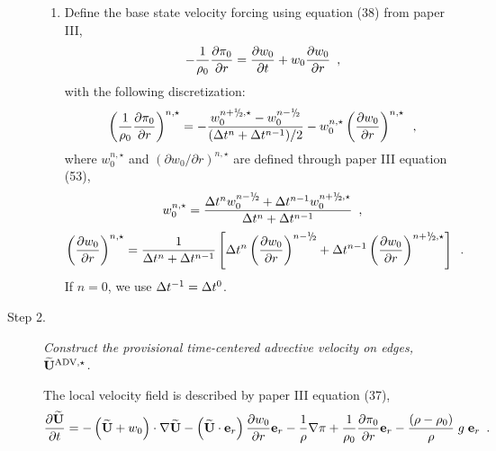 \begin{description}
\begin{enumerate}
\item Define the base state velocity forcing using equation (38) from paper III,
\begin{equation}
-\frac{1}{\rho_0} \frac{\partial \pi_0}{\partial r} 
= \frac{\partial w_0}{\partial t} + w_0 \frac{\partial w_0}{\partial r} 
\enskip, \label{eq:pizero}
\end{equation}
with the following discretization:
\begin{equation}
\left ( \frac{1}{\rho_0} \frac{\partial \pi_0}{\partial r} \right )^{n,\star} = 
-\frac{w_0^{\nph,\star} - w_0^\nmh}{(\dt^n+\dt^{n-1})/2} 
- w_0^{n,\star} \left(\frac{\partial w_0}{\partial r}\right)^{n,\star} \enskip ,
\end{equation} 
where $w_0^{n,\star}$ and $(\partial w_0 / \partial r)^{n,\star}$ are defined through 
paper III equation (53),
\begin{equation}
w_0^{n,\star} = \frac{\dt^{n} w_0^{\nmh} + \dt^{n-1} w_0^{\nph,\star}}{\dt^n+\dt^{n-1}} 
\enskip,
\end{equation}
\begin{equation}
\left(\frac{\partial w_0}{\partial r}\right)^{n,\star} = 
\frac{1}{\dt^n+\dt^{n-1} } 
\left [ \dt^{n} \left(\frac{\partial w_0 }{ \partial r}\right)^{\nmh}
+ \dt^{n-1} \left(\frac{\partial w_0 }{ \partial r}\right)^{\nph,\star} \right ] 
\enskip.
\end{equation}
If $n=0$, we use $\Delta t^{-1} = \Delta t^0$.

\end{enumerate}

\item[Step 2.] {\em Construct the provisional time-centered advective velocity on 
edges, $\widetilde{\mathbf{U}}^{\mathrm{ADV},\star}$.}

The local velocity field is described by paper III equation (37),
\begin{equation}
\frac{\partial\widetilde{{\bf U}}}{\partial t} = 
- \left(\widetilde{{\bf U}}+w_0\right) \cdot \nabla \widetilde{{\bf U}}
- \left(\widetilde{{\bf U}} \cdot {\bf e}_r\right) \frac{\partial w_0}{\partial r} {\bf e}_r
- \frac{1}{\rho} \nabla\pi
+ \frac{1}{\rho_0} \frac{\partial \pi_0}{\partial r} {\bf e}_r
- \frac{(\rho-\rho_0)}{\rho} \; g \; {\bf e}_r  \label{eq:utildeupd}  \enskip .
\end{equation}


\end{description}
